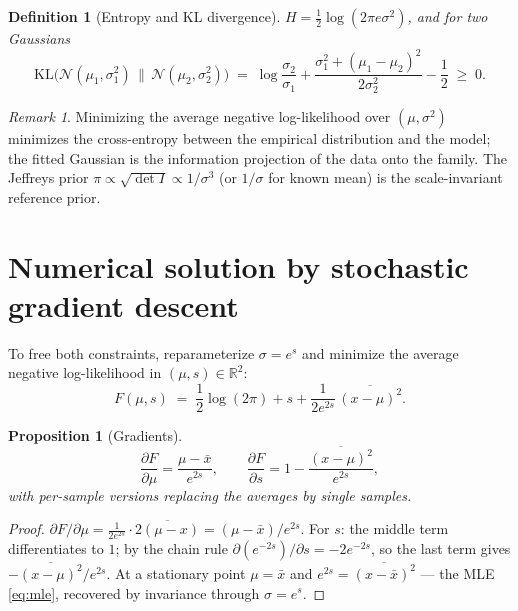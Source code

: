 \documentclass[11pt]{article}
\newtheorem{definition}{Definition}
\newtheorem{proposition}{Proposition}
\theoremstyle{remark}
\newtheorem{remark}{Remark}
\newcommand{\xbar}{\bar{x}}
\begin{document}
\begin{definition}[Entropy and KL divergence]
$H = \tfrac12\log(2\pi e\sigma^2)$, and for two Gaussians
\begin{equation}
  \mathrm{KL}\bigl(\mathcal{N}(\mu_1,\sigma_1^2) \,\|\,
  \mathcal{N}(\mu_2,\sigma_2^2)\bigr)
  \;=\; \log\frac{\sigma_2}{\sigma_1}
  + \frac{\sigma_1^2 + (\mu_1 - \mu_2)^2}{2\sigma_2^2}
  - \frac12 \;\ge\; 0.
  \label{eq:kl}
\end{equation}
\end{definition}

\begin{remark}
Minimizing the average negative log-likelihood over
$(\mu, \sigma^2)$ minimizes the cross-entropy between the empirical
distribution and the model; the fitted Gaussian is the
information projection of the data onto the family. The Jeffreys
prior $\pi \propto \sqrt{\det I} \propto 1/\sigma^3$ (or
$1/\sigma$ for known mean) is the scale-invariant reference prior.
\end{remark}

\section{Numerical solution by stochastic gradient descent}

To free both constraints, reparameterize $\sigma = e^{s}$ and
minimize the average negative log-likelihood in $(\mu, s) \in
\mathbb{R}^2$:
\begin{equation}
  F(\mu, s) \;=\; \frac12\log(2\pi) + s
  + \frac{1}{2e^{2s}}\,\overline{(x - \mu)^2}.
\end{equation}

\begin{proposition}[Gradients]
\begin{equation}
  \boxed{\;
  \frac{\partial F}{\partial \mu} = \frac{\mu - \xbar}{e^{2s}},
  \qquad
  \frac{\partial F}{\partial s}
  = 1 - \frac{\overline{(x-\mu)^2}}{e^{2s}},\;}
  \label{eq:grad}
\end{equation}
with per-sample versions replacing the averages by single samples.
\end{proposition}

\begin{proof}
$\partial F/\partial \mu = \tfrac{1}{2e^{2s}} \cdot
\overline{2(\mu - x)} = (\mu - \xbar)/e^{2s}$. For $s$: the middle
term differentiates to $1$; by the chain rule
$\partial (e^{-2s})/\partial s = -2e^{-2s}$, so the last term gives
$-\overline{(x-\mu)^2}/e^{2s}$. At a stationary point
$\mu = \xbar$ and $e^{2s} = \overline{(x-\xbar)^2}$ --- the MLE
\eqref{eq:mle}, recovered by invariance through
$\sigma = e^{s}$.
\end{proof}
\end{document}
